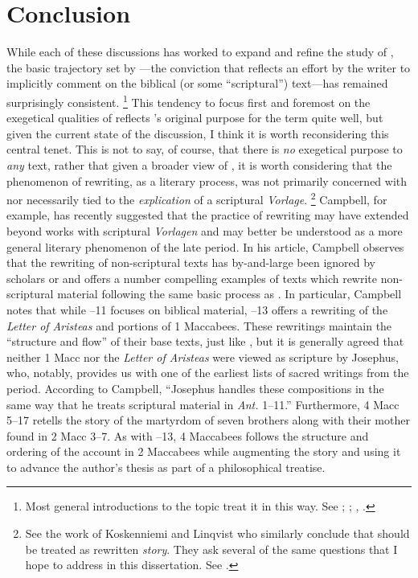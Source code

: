 
\section{Conclusion}

While each of these discussions has worked to expand and refine the study of \rwb, the basic trajectory set by \vermes---the conviction that \rwb reflects an effort by the writer to implicitly comment on the biblical (or some ``scriptural'') text---has remained surprisingly consistent.%
%
\footnote{Most general introductions to the topic treat it in this way. See \cite{crawford_charlesworth2000}; \cite{brooke_schiffman-vanderkam2000}; \cite{zahn_lim-collins2010}, \cite{zahn2011}.}
%
This tendency to focus first and foremost on the exegetical qualities of \rwb reflects \vermes's original purpose for the term quite well, but given the current state of the discussion, I think it is worth reconsidering this central tenet. This is not to say, of course, that there is \emph{no} exegetical purpose to \emph{any} \rwb text, rather that given a broader view of \rwb, it is worth considering that the phenomenon of rewriting, as a literary process, was not primarily concerned with nor necessarily tied to the \emph{explication} of a scriptural \emph{Vorlage}.%
%
\footnote{See the work of Koskenniemi and Linqvist who similarly conclude that \rwb should be treated as rewritten \emph{story}. They ask several of the same questions that I hope to address in this dissertation. See \cite{koskenniemi-lindqvist_laato-ruiten2008}.}
%
Campbell, for example, has recently suggested that the practice of rewriting may have extended beyond works with scriptural \emph{Vorlagen} and may better be understood as a more general literary phenomenon of the late \secondtemple period.\autocite{campbell_zsengeller2014} In his article, Campbell observes that the rewriting of non-scriptural texts has by-and-large been ignored by scholars or \rwb and offers a number compelling examples of \secondtemple texts which rewrite non-scriptural material following the same basic process as \rwb. In particular, Campbell notes that while --11 focuses on biblical material, --13 offers a rewriting of the \emph{Letter of Aristeas} and portions of 1 Maccabees. These rewritings maintain the ``structure and flow'' of their base texts, just like \rwb, but it is generally agreed that neither 1 Macc nor the \emph{Letter of Aristeas} were viewed as scripture by Josephus, who, notably, provides us with one of the earliest lists of sacred writings from the period.\autocite{mason2002_mcdonald-sanders2002} According to Campbell, ``Josephus handles these compositions in the same way that he treats scriptural material in \emph{Ant.} 1--11.''\autocites[70]{campbell_zsengeller2014}[See also][126]{mason2002_mcdonald-sanders2002} Furthermore, 4 Macc 5--17 retells the story of the martyrdom of seven brothers along with their mother found in 2 Macc 3--7. As with --13, 4 Maccabees follows the structure and ordering of the account in 2 Maccabees while augmenting the story and using it to advance the author's thesis as part of a philosophical treatise. 

